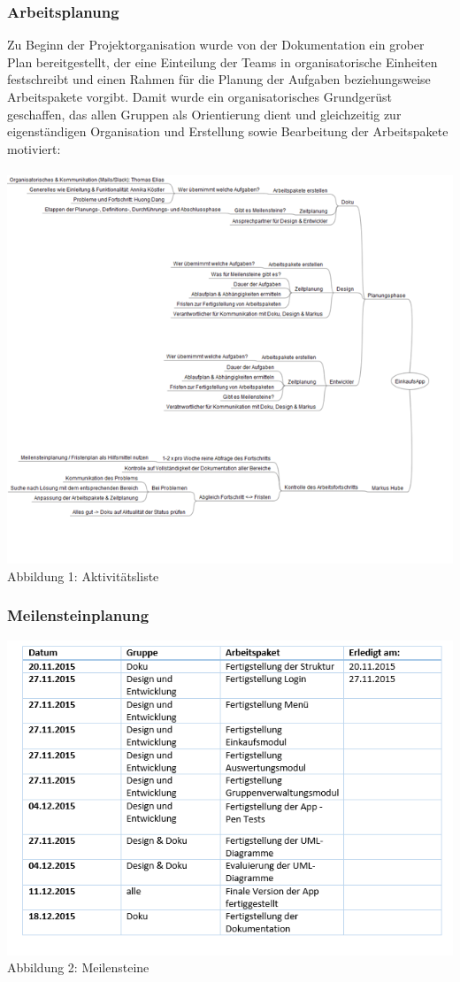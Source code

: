 \documentclass[12pt,a4paper]{article}
\begin{document}
\subsubsection{Arbeitsplanung}
Zu Beginn der Projektorganisation wurde von der Dokumentation ein grober Plan bereitgestellt, der eine Einteilung der Teams in organisatorische Einheiten festschreibt und einen Rahmen für die Planung der Aufgaben beziehungsweise Arbeitspakete vorgibt. Damit wurde ein organisatorisches Grundgerüst geschaffen, das allen Gruppen als Orientierung dient und gleichzeitig zur eigenständigen Organisation und Erstellung sowie Bearbeitung der Arbeitspakete motiviert:
\\
\\
\includegraphics[scale=0.6, origin=l]{Aktivitaetsliste.png}
\\
\footnotesize Abbildung 1: Aktivitätsliste
\normalsize
\\
\linebreak
\subsubsection*{Meilensteinplanung}
\includegraphics[scale=0.6, origin=l]{Meilensteine.png}
\\
\footnotesize Abbildung 2: Meilensteine
\normalsize
\\
\linebreak
\end{document}
